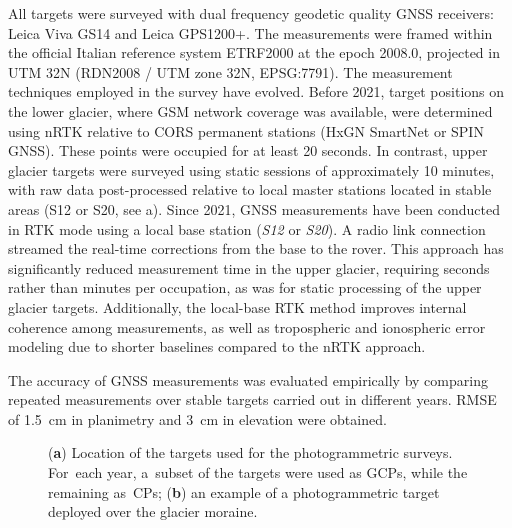 All targets were surveyed with dual frequency geodetic quality GNSS receivers: 
Leica Viva GS14 and Leica GPS1200+.
The measurements were framed within the official Italian reference system ETRF2000
at the epoch 2008.0, projected in UTM 32N (RDN2008 / UTM zone 32N, EPSG:7791).
The measurement techniques employed in the survey have evolved.
Before 2021, target positions on the lower glacier, where GSM network coverage was available, were determined using nRTK relative to CORS permanent stations (HxGN SmartNet or SPIN GNSS). 
These points were occupied for at least 20 seconds. 
In contrast, upper glacier targets were surveyed using static sessions of approximately 10 
minutes, with raw data post-processed relative to local master stations located in stable areas (S12 or S20, see a).
Since 2021, GNSS measurements have been conducted in RTK mode using a local base station (\textit{S12} or \textit{S20}).
A radio link connection streamed the real-time corrections from the base to the rover. 
This approach has significantly reduced measurement time in the upper glacier, requiring seconds rather than minutes per occupation, as was for static processing of the upper glacier targets.
Additionally, the local-base RTK method improves internal coherence among measurements, 
as well as tropospheric and ionospheric error modeling due to shorter baselines compared to 
the nRTK approach.

The accuracy of GNSS measurements was evaluated empirically by comparing repeated
measurements over stable targets carried out in different years.
RMSE of \qty{1.5}{\centi\meter} in planimetry and \qty{3}{\centi\meter} in elevation were
obtained.

\begin{figure}
    \centering
    \caption{(\textbf{a}) Location of the targets used for the
        photogrammetric surveys. For~each year, a~subset of the targets were used as GCPs, while the remaining as~CPs; (\textbf{b}) an example of a photogrammetric target deployed over the glacier moraine.}
    \label{fig:3:belvedereGCP}
\end{figure}


